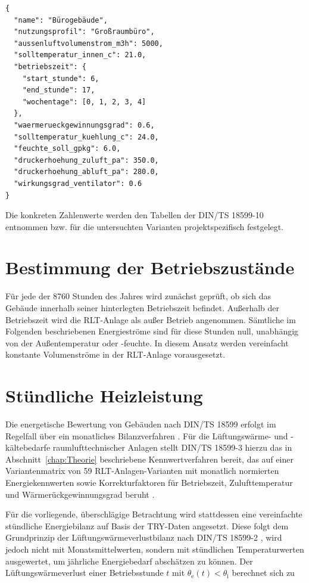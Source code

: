 \documentclass{scrreprt}
\begin{document}
\begin{lstlisting}[caption={Nutzungsprofil JSON}, label={lst:beispiel}]
{
  "name": "Bürogebäude",
  "nutzungsprofil": "Großraumbüro",
  "aussenluftvolumenstrom_m3h": 5000,
  "solltemperatur_innen_c": 21.0,
  "betriebszeit": {
    "start_stunde": 6,
    "end_stunde": 17,
    "wochentage": [0, 1, 2, 3, 4]
  },
  "waermerueckgewinnungsgrad": 0.6,
  "solltemperatur_kuehlung_c": 24.0,
  "feuchte_soll_gpkg": 6.0,
  "druckerhoehung_zuluft_pa": 350.0,
  "druckerhoehung_abluft_pa": 280.0,
  "wirkungsgrad_ventilator": 0.6
}
\end{lstlisting}

Die konkreten Zahlenwerte werden den Tabellen der DIN/TS 18599-10 entnommen bzw. für die
untersuchten Varianten projektspezifisch festgelegt.

\section{Bestimmung der Betriebszustände}
Für jede der 8760 Stunden des Jahres wird zunächst geprüft, ob sich das
Gebäude innerhalb seiner hinterlegten Betriebszeit befindet.
Außerhalb der Betriebszeit wird die \ac{RLT}-Anlage als außer Betrieb angenommen. Sämtliche im Folgenden beschriebenen Energieströme
sind für diese Stunden null, unabhängig von der Außentemperatur oder
-feuchte. In diesem Ansatz werden vereinfacht konstante Volumenströme in der \ac{RLT}-Anlage vorausgesetzt.

\section{Stündliche Heizleistung}
Die energetische Bewertung von Gebäuden nach DIN/TS 18599 erfolgt im
Regelfall über ein monatliches Bilanzverfahren \parencite{DIN1859910}.
Für die Lüftungswärme- und -kältebedarfe raumlufttechnischer Anlagen
stellt DIN/TS 18599-3 hierzu das in Abschnitt~\ref{chap:Theorie}
beschriebene Kennwertverfahren bereit, das auf einer Variantenmatrix
von 59 RLT-Anlagen-Varianten mit monatlich normierten Energiekennwerten
sowie Korrekturfaktoren für Betriebszeit, Zulufttemperatur und
Wärmerückgewinnungsgrad beruht \parencite{DIN185993}.

Für die vorliegende, überschlägige Betrachtung wird stattdessen eine
vereinfachte stündliche Energiebilanz auf Basis der \ac{TRY}-Daten
angesetzt. Diese folgt dem Grundprinzip der Lüftungswärmeverlustbilanz
nach DIN/TS 18599-2 \parencite{DIN185992}, wird jedoch nicht mit
Monatsmittelwerten, sondern mit stündlichen Temperaturwerten
ausgewertet, um jährliche Energiebedarf abschätzen zu können. Der
Lüftungswärmeverlust einer Betriebsstunde $t$ mit
$\theta_{\mathrm{e}}(t) < \theta_{\mathrm{i}}$ berechnet sich zu
\end{document}
